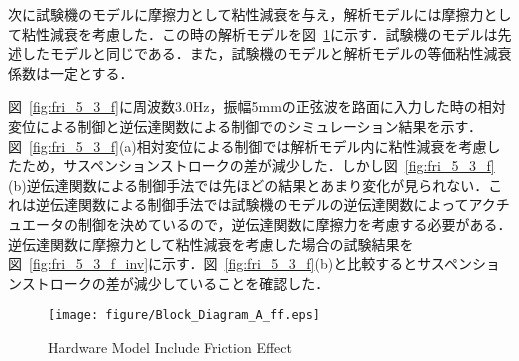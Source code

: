 \documentclass[a4paper,12pt]{article_vdlab_sotsuron}
\begin{document}
\newpage
次に試験機のモデルに摩擦力として粘性減衰を与え，解析モデルには摩擦力として粘性減衰を考慮した．この時の解析モデルを図~\ref{fig:sim_F_model}に示す．試験機のモデルは先述したモデルと同じである．また，試験機のモデルと解析モデルの等価粘性減衰係数は一定とする．
\par
図~\ref{fig:fri_5_3_f}に周波数3.0Hz，振幅5mmの正弦波を路面に入力した時の相対変位による制御と逆伝達関数による制御でのシミュレーション結果を示す．図~\ref{fig:fri_5_3_f}(a)相対変位による制御では解析モデル内に粘性減衰を考慮したため，サスペンションストロークの差が減少した．しかし図~\ref{fig:fri_5_3_f}(b)逆伝達関数による制御手法では先ほどの結果とあまり変化が見られない．これは逆伝達関数による制御手法では試験機のモデルの逆伝達関数によってアクチュエータの制御を決めているので，逆伝達関数に摩擦力を考慮する必要がある．逆伝達関数に摩擦力として粘性減衰を考慮した場合の試験結果を図~\ref{fig:fri_5_3_f_inv}に示す．図~\ref{fig:fri_5_3_f}(b)と比較するとサスペンションストロークの差が減少していることを確認した．

\vspace*{1mm}
\begin{figure}[h]
  \begin{center}
    \texttt{[image: figure/Block\_Diagram\_A\_ff.eps]}
    \caption{Hardware Model Include Friction Effect}
    \label{fig:sim_F_model}
  \end{center}
\end{figure}
\end{document}

